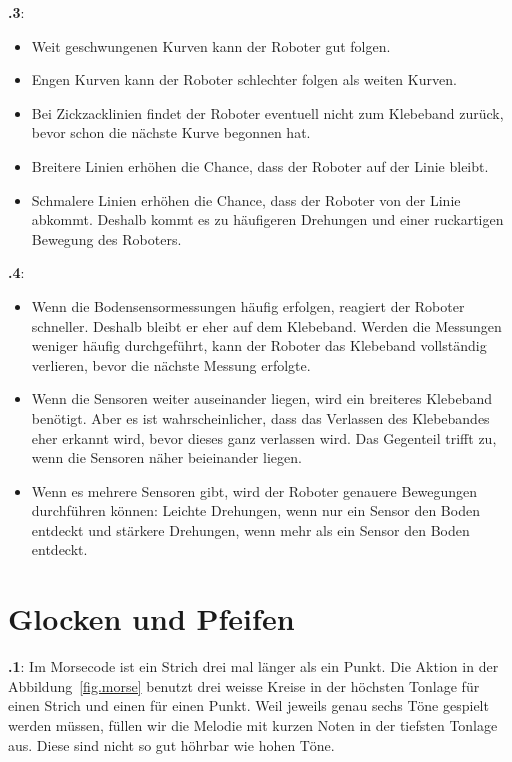 \documentclass[12pt,a4paper,english]{article}
\begin{document}
\textbf{\thesection.3}:
\begin{itemize}
\item Weit geschwungenen Kurven kann der Roboter gut folgen.
\item Engen Kurven kann der Roboter schlechter folgen als weiten Kurven.
\item Bei Zickzacklinien findet der Roboter eventuell nicht zum Klebeband zurück, bevor schon die nächste Kurve begonnen hat.
\item Breitere Linien erhöhen die Chance, dass der Roboter auf der Linie bleibt. 
\item Schmalere Linien erhöhen die Chance, dass der Roboter von der Linie abkommt. 
Deshalb kommt es zu häufigeren Drehungen und einer ruckartigen Bewegung des Roboters.
\end{itemize}


\textbf{\thesection.4}:
\begin{itemize}
\item Wenn die Bodensensormessungen häufig erfolgen, reagiert der Roboter schneller. Deshalb bleibt er eher auf dem Klebeband. Werden die Messungen weniger häufig durchgeführt, kann der Roboter das Klebeband vollständig verlieren, bevor die nächste Messung erfolgte.
\item Wenn die Sensoren weiter auseinander liegen, wird ein breiteres Klebeband benötigt. Aber es ist wahrscheinlicher, dass das Verlassen des Klebebandes eher erkannt wird, bevor dieses ganz verlassen wird. Das Gegenteil trifft zu, wenn die Sensoren näher beieinander liegen.
\item Wenn es mehrere Sensoren gibt, wird der Roboter genauere Bewegungen durchführen können: Leichte Drehungen, wenn nur ein Sensor den Boden entdeckt und stärkere Drehungen, wenn mehr als ein Sensor den Boden entdeckt.
\end{itemize}

\section{Glocken und Pfeifen}

\textbf{\thesection.1}: Im Morsecode ist ein Strich drei mal länger als ein Punkt. Die Aktion in der Abbildung~\ref{fig.morse} benutzt drei weisse Kreise in der höchsten Tonlage für einen Strich und einen für einen Punkt. Weil jeweils genau sechs Töne gespielt werden müssen, füllen wir die Melodie mit kurzen Noten in der tiefsten Tonlage aus. Diese sind nicht so gut höhrbar wie hohen Töne.
\end{document}
